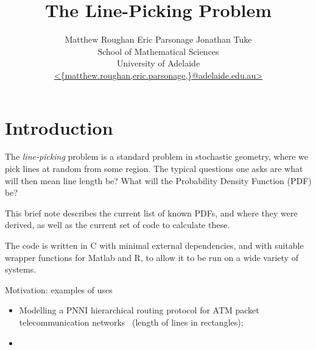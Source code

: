 \documentclass{article}
\newcommand{\titlestr}{The Line-Picking Problem}
\begin{document}
\title{\titlestr}
\author{Matthew Roughan \;\;\; Eric Parsonage \;\;\; Jonathan Tuke \\
 School of Mathematical Sciences \\
 University of Adelaide \\
 \url{ <{matthew.roughan,eric.parsonage,}@adelaide.edu.au> } }
\maketitle

\begin{abstract}

\end{abstract}

\section{Introduction}

The {\em line-picking} problem is a standard problem in stochastic
geometry, where we pick lines at random from some region. The typical
questions one asks are what will then mean line length be? What will
the Probability Density Function (PDF) be?

This brief note describes the current list of known PDFs, and where
they were derived, as well as the current set of code to calculate
these. 

The code is written in C with minimal external dependencies, and with
suitable wrapper functions for Matlab and R, to allow it to be run on
a wide variety of systems.



Motivation: examples of uses
\begin{itemize}

\item Modelling a PNNI hierarchical routing protocol for ATM packet
  telecommunication networks~\cite{Rosenberg200499} (length of lines
  in rectangles);

\item 

\end{itemize}
\end{document}

